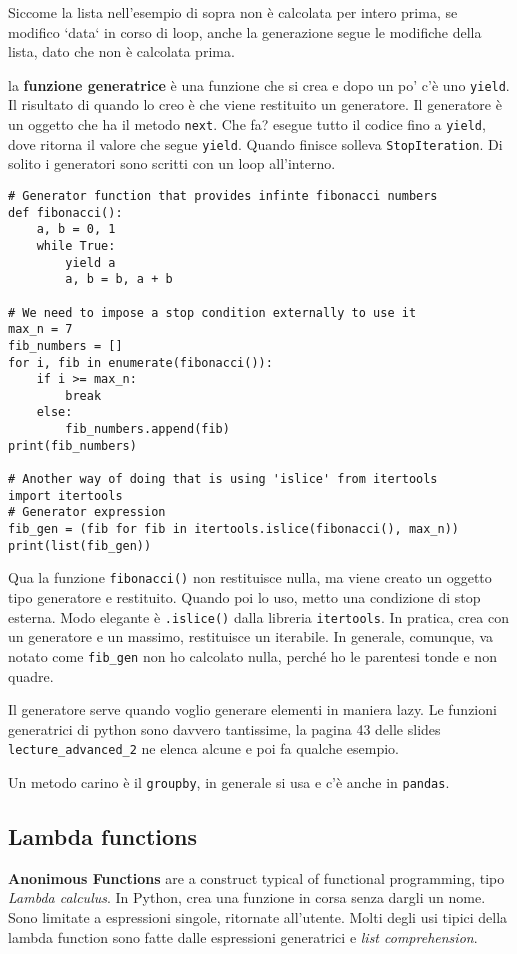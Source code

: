 \documentclass[10pt, a4paper, titlepage]{book}
\begin{document}
Siccome la lista nell'esempio di sopra non è calcolata per intero prima, se modifico `data` in corso di loop, anche la generazione segue le modifiche della lista, dato che non è calcolata prima.

la \textbf{funzione generatrice} è una funzione che si crea e dopo un po' c'è uno \texttt{yield}. Il risultato di quando lo creo è che viene restituito un generatore. 
Il generatore è un oggetto che ha il metodo \texttt{next}. Che fa? esegue tutto il codice fino a \texttt{yield}, dove ritorna il valore che segue \texttt{yield}. Quando finisce solleva \texttt{StopIteration}.
Di solito i generatori sono scritti con un loop all'interno.

\begin{verbatim}
# Generator function that provides infinte fibonacci numbers
def fibonacci():
	a, b = 0, 1
	while True:
		yield a
		a, b = b, a + b

# We need to impose a stop condition externally to use it
max_n = 7
fib_numbers = []
for i, fib in enumerate(fibonacci()):
	if i >= max_n:
		break
	else:
		fib_numbers.append(fib)
print(fib_numbers)

# Another way of doing that is using 'islice' from itertools
import itertools
# Generator expression
fib_gen = (fib for fib in itertools.islice(fibonacci(), max_n))
print(list(fib_gen))
\end{verbatim}

Qua la funzione \texttt{fibonacci()} non restituisce nulla, ma viene creato un oggetto tipo generatore e restituito. Quando poi lo uso, metto una condizione di stop esterna.
Modo elegante è \texttt{.islice()} dalla libreria \texttt{itertools}. In pratica, crea con un generatore e un massimo, restituisce un iterabile. In generale, comunque, va notato come \texttt{fib_gen} non ho calcolato nulla, perché ho le parentesi tonde e non quadre.

Il generatore serve quando voglio generare elementi in maniera lazy.
Le funzioni generatrici di python sono davvero tantissime, la pagina 43 delle slides \texttt{lecture\_advanced\_2} ne elenca alcune e poi fa qualche esempio.

Un metodo carino è il \texttt{groupby}, in generale si usa e c'è anche in \texttt{pandas}.

\subsection{Lambda functions}

\textbf{Anonimous Functions} are a construct typical of functional programming, tipo \textit{Lambda calculus}.
In Python, crea una funzione in corsa senza dargli un nome. Sono limitate a espressioni singole, ritornate all'utente. Molti degli usi tipici della lambda function sono fatte dalle espressioni generatrici e \textit{list comprehension}.
\end{document}
